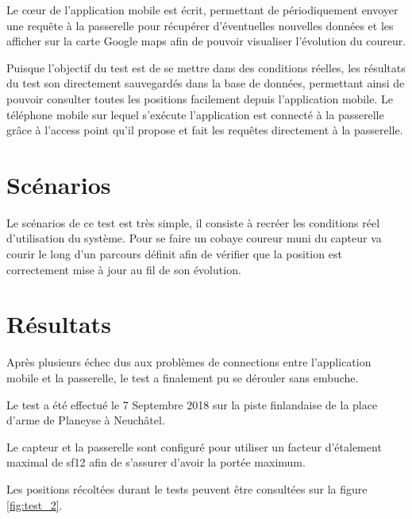 Le cœur de l'application mobile est écrit, permettant de périodiquement envoyer une requête à la passerelle pour récupérer d'éventuelles nouvelles données et les afficher sur la carte Google maps afin de pouvoir visualiser l'évolution du coureur.

Puisque l'objectif du test est de se mettre dans des conditions réelles, les résultats du test son directement sauvegardés dans la base de données, permettant ainsi de pouvoir consulter toutes les positions facilement depuis l'application mobile. Le téléphone mobile sur lequel s'exécute l'application est connecté à la passerelle grâce à l'access point qu'il propose et fait les requêtes directement à la passerelle.


\section{Scénarios}

Le scénarios de ce test est très simple, il consiste à recréer les conditions réel d'utilisation du système. Pour se faire un cobaye coureur muni du capteur va courir le long d'un parcours définit afin de vérifier que la position est correctement mise à jour au fil de son évolution.

\section{Résultats}

Après plusieurs échec dus aux problèmes de connections entre l'application mobile et la passerelle, le test a finalement pu se dérouler sans embuche.

Le test a été effectué le 7 Septembre 2018 sur la piste finlandaise de la place d'arme de Planeyse à Neuchâtel.

Le capteur et la passerelle sont configuré pour utiliser un facteur d'étalement maximal de sf12 afin de s'assurer d'avoir la portée maximum.

Les positions récoltées durant le tests peuvent être consultées sur la figure \ref{fig:test_2}.

